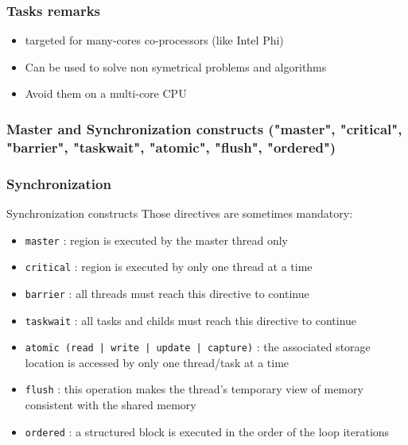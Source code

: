 \begin{frame}[containsverbatim]
\frametitle{Tasks remarks}

\begin{itemize}
        \item{targeted for many-cores co-processors (like Intel Phi)}
        \item{Can be used to solve non symetrical problems and algorithms}
        \item{Avoid them on a multi-core CPU}
\end{itemize}

\end{frame}



\subsubsection[Master and Synchronization constructs]{Master and Synchronization constructs ("master", "critical", "barrier", "taskwait", "atomic", "flush", "ordered")}


\begin{frame}
\frametitle{Synchronization}
\begin{block}{Synchronization constructs}
Those directives are sometimes mandatory:
\begin{itemize}
        \item{\texttt{master} : region is executed by the master thread only }
        \item{\texttt{critical} : region is executed by only one thread at a time }
        \item{\texttt{barrier} : all threads must reach this directive to continue}
        \item{\texttt{taskwait} : all tasks and childs must reach this directive to continue}
        \item{\texttt{atomic (read | write | update | capture)} : the associated storage location is accessed by only one thread/task at a time}
        \item{\texttt{flush} : this operation makes the thread's temporary view of memory consistent with the shared memory}
        \item{\texttt{ordered} : a structured block is executed in the order of the loop iterations }
\end{itemize}
\end{block}

\end{frame}


